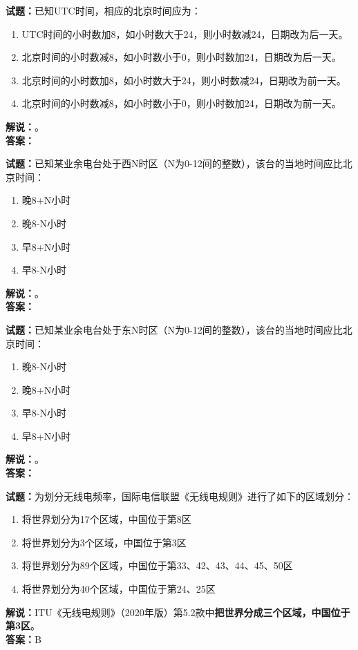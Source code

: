 \documentclass{ctexbook}
\begin{document}
\noindent\textbf{试题：}已知UTC时间，相应的北京时间应为：
\begin{enumerate}[leftmargin=3em]
\item UTC时间的小时数加8，如小时数大于24，则小时数减24，日期改为后一天。
\item 北京时间的小时数减8，如小时数小于0，则小时数加24，日期改为后一天。
\item 北京时间的小时数加8，如小时数大于24，则小时数减24，日期改为前一天。
\item 北京时间的小时数减8，如小时数小于0，则小时数加24，日期改为前一天。
\end{enumerate}
\noindent\textbf{解说：}\textbf{}。\\\noindent\textbf{答案：}

\bigskip




\noindent\textbf{试题：}已知某业余电台处于西N时区（N为0-12间的整数），该台的当地时间应比北京时间：
\begin{enumerate}[leftmargin=3em]
\item 晚8+N小时
\item 晚8-N小时
\item 早8+N小时
\item 早8-N小时
\end{enumerate}
\noindent\textbf{解说：}\textbf{}。\\\noindent\textbf{答案：}

\bigskip




\noindent\textbf{试题：}已知某业余电台处于东N时区（N为0-12间的整数），该台的当地时间应比北京时间：
\begin{enumerate}[leftmargin=3em]
\item 晚8-N小时
\item 晚8+N小时
\item 早8-N小时
\item 早8+N小时
\end{enumerate}
\noindent\textbf{解说：}\textbf{}。\\\noindent\textbf{答案：}

\bigskip




\noindent\textbf{试题：}为划分无线电频率，国际电信联盟《无线电规则》进行了如下的区域划分：
\begin{enumerate}[leftmargin=3em]
\item 将世界划分为17个区域，中国位于第8区
\item 将世界划分为3个区域，中国位于第3区
\item 将世界划分为89个区域，中国位于第33、42、43、44、45、50区
\item 将世界划分为40个区域，中国位于第24、25区
\end{enumerate}
\noindent\textbf{解说：}ITU《无线电规则》（2020年版）第5.2款中\textbf{把世界分成三个区域，中国位于第3区}。\\\noindent\textbf{答案：}B
\end{document}

